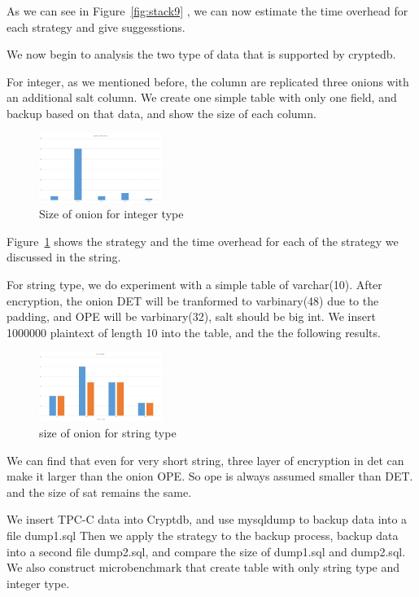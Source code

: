 As we can see in Figure~\ref{fig:stack9} , we can now estimate the time overhead for each strategy and give suggesstions.


We now begin to analysis the two type of data that is supported by cryptedb.

For integer, as we mentioned before, the column are replicated three onions with an additional salt column. We create one simple table with only one field, and backup based on that data, and show the size of each column.


\begin{figure}[tb]
\centering
\includegraphics[width=4cm]{images/sizeofeachonion.png}
\caption{Size of onion for integer type}
\label{fig:stack11}
\end{figure}

Figure~\ref{fig:stack11} shows the strategy and the time overhead for each of the strategy we discussed in the string.


For string type, we do experiment with a simple table of varchar(10). After encryption, the onion DET will be tranformed to varbinary(48) due to the padding, and OPE will be varbinary(32), salt should be big int. We insert 1000000 plaintext of length 10 into the table, and the the following results. 


\begin{figure}[tb]
\centering
\includegraphics[width=4cm]{images/sizeofstr.png}
\caption{size of onion for string type}
\label{fig:stack12}
\end{figure}


We can find that even for very short string, three layer of encryption in det can make it larger than the onion OPE. So ope is always assumed  smaller than DET. and the size of sat remains the same.


We insert TPC-C data into Cryptdb, and use mysqldump to backup data into a file dump1.sql Then we apply the strategy to the backup process, backup data into a second file dump2.sql, and compare the size of dump1.sql and dump2.sql. We also construct microbenchmark that create table with only string type and integer type.



